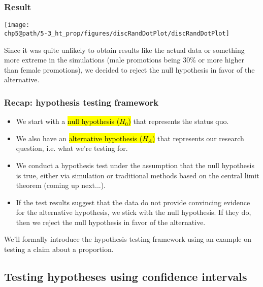 
\begin{frame}
\frametitle{Result}

\begin{center}
\texttt{[image: \\chp5@path/5-3\_ht\_prop/figures/discRandDotPlot/discRandDotPlot]}
\end{center}

\pause

Since it was quite unlikely to obtain results like the actual data or something more extreme in the simulations (male promotions being 30\% or more higher than female promotions), we decided to reject the null hypothesis in favor of the alternative.

\end{frame}


\begin{frame}
\frametitle{Recap: hypothesis testing framework}

\begin{itemize}
\item We start with a \hl{null hypothesis ($H_0$)} that represents the status quo.
\pause
\item We also have an \hl{alternative hypothesis ($H_A$)} that represents our research question, i.e. what we're testing for.
\pause
\item We conduct a hypothesis test under the assumption that the null hypothesis is true, either via simulation or traditional methods based on the central limit theorem (coming up next...).
\pause
\item If the test results suggest that the data do not provide convincing evidence for the alternative hypothesis, we stick with the null hypothesis. If they do, then we reject the null hypothesis in favor of the alternative.
\end{itemize}
\pause
We'll formally introduce the hypothesis testing framework using an example on testing a claim about a proportion.

\end{frame}


 \subsection{Testing hypotheses using confidence intervals} 
 
